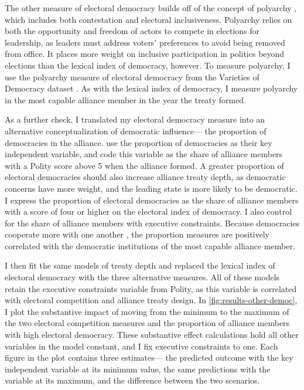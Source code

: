 \documentclass[12pt]{article}
\begin{document}
The other measure of electoral democracy builds off of the concept of polyarchy \citep{Dahl1971}, which includes both contestation and electoral inclusiveness. 
Polyarchy relies on both the opportunity and freedom of actors to compete in elections for leadership, as leaders must address voters' preferences to avoid being removed from office. 
It places more weight on inclusive participation in politics beyond elections than the lexical index of democracy, however. 
To measure polyarchy, I use the polyarchy measure of electoral democracy from the Varieties of Democracy dataset \citep{Teorelletal2016}.
As with the lexical index of democracy, I measure polyarchy in the most capable alliance member in the year the treaty formed.



As a further check, I translated my electoral democracy measure into an alternative conceptualization of democratic influence--- the proportion of democracies in the alliance.
\citet{Chibaetal2015} use the proportion of democracies as their key independent variable, and code this variable as the share of alliance members with a Polity score above 5 when the alliance formed. 
A greater proportion of electoral democracies should also increase alliance treaty depth, as democratic concerns have more weight, and the leading state is more likely to be democratic. 
I express the proportion of electoral democracies as the share of alliance members with a score of four or higher on the electoral index of democracy. 
I also control for the share of alliance members with executive constraints. 
Because democracies cooperate more with one another \citep{Leeds1999}, the proportion measures are positively correlated with the democratic institutions of the most capable alliance member. 
 
I then fit the same models of treaty depth and replaced the lexical index of electoral democracy with the three alternative measures.
All of these models retain the executive constraints variable from Polity, as this variable is correlated with electoral competition and alliance treaty design. 
In \autoref{fig:results-other-democ}, I plot the substantive impact of moving from the minimum to the maximum of the two electoral competition measures and the proportion of alliance members with high electoral democracy. 
These substantive effect calculations hold all other variables in the model constant, and I fix executive constraints to one. 
Each figure in the plot contains three estimates--- the predicted outcome with the key independent variable at its minimum value, the same predictions with the variable at its maximum, and the difference between the two scenarios. 
\end{document}
